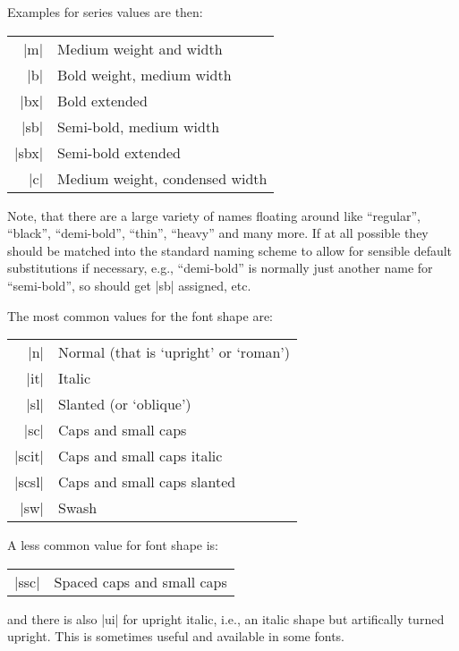 \documentclass{ltxguide}[1995/11/28]
\begin{document}
Examples for series values are then:
\begin{center}
  \begin{minipage}{.7\linewidth}
    \begin{tabular}{rl}
      |m|   & Medium weight and width  \\
      |b|   & Bold weight, medium width  \\
      |bx|  & Bold extended \\
      |sb|  & Semi-bold, medium width\\
      |sbx| & Semi-bold extended\\
      |c|   & Medium weight, condensed width
    \end{tabular}
  \end{minipage}
\end{center}
Note, that there are a large variety of names floating around like
``regular'', ``black'', ``demi-bold'', ``thin'', ``heavy'' and many
more.  If at all possible they should be matched into the standard
naming scheme to allow for sensible default substitutions if necessary,
e.g., ``demi-bold'' is normally just another name for ``semi-bold'', so
should get |sb| assigned, etc.


The most common values for the font shape are:
\begin{center}
  \begin{minipage}{.7\linewidth}
    \begin{tabular}{rl}
      |n|    & Normal (that is `upright' or `roman') \\
      |it|   & Italic                                \\
      |sl|   & Slanted (or `oblique')                \\
      |sc|   & Caps and small caps                   \\
      |scit| & Caps and small caps italic            \\
      |scsl| & Caps and small caps slanted           \\
      |sw|   & Swash
    \end{tabular}
  \end{minipage}
\end{center}
A less common value for font shape is:
\begin{center}
  \begin{minipage}{.7\linewidth}
    \begin{tabular}{rl}
      |ssc|  & Spaced caps and small caps
    \end{tabular}
  \end{minipage}
\end{center}
and there is also |ui| for upright italic, i.e., an italic shape but
artifically turned upright. This is sometimes useful and available in
some fonts.
\end{document}
